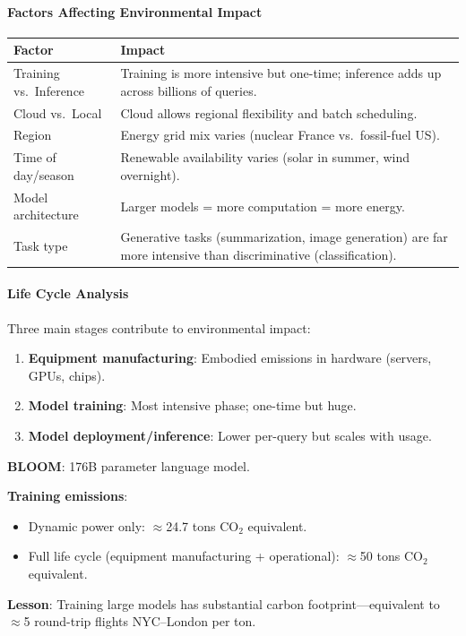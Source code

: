 \paragraph*{Factors Affecting Environmental Impact}

\begin{center}
\renewcommand{\arraystretch}{1.3}
\begin{tabular}{@{} l p{8cm} @{}}
\toprule
\textbf{Factor} & \textbf{Impact} \\
\midrule
Training vs.\ Inference & Training is more intensive but one-time; inference adds up across billions of queries. \\
Cloud vs.\ Local & Cloud allows regional flexibility and batch scheduling. \\
Region & Energy grid mix varies (nuclear France vs.\ fossil-fuel US). \\
Time of day/season & Renewable availability varies (solar in summer, wind overnight). \\
Model architecture & Larger models = more computation = more energy. \\
Task type & Generative tasks (summarization, image generation) are far more intensive than discriminative (classification). \\
\bottomrule
\end{tabular}
\end{center}

\paragraph*{Life Cycle Analysis}

Three main stages contribute to environmental impact:

\begin{enumerate}
  \item \textbf{Equipment manufacturing}: Embodied emissions in hardware (servers, GPUs, chips).
  \item \textbf{Model training}: Most intensive phase; one-time but huge.
  \item \textbf{Model deployment/inference}: Lower per-query but scales with usage.
\end{enumerate}

\begin{exbox}
\textbf{BLOOM}: 176B parameter language model.

\textbf{Training emissions}:
\begin{itemize}
  \item Dynamic power only: $\approx$24.7 tons CO$_2$ equivalent.
  \item Full life cycle (equipment manufacturing + operational): $\approx$50 tons CO$_2$ equivalent.
\end{itemize}

\textbf{Lesson}: Training large models has substantial carbon footprint---equivalent to $\approx$5 round-trip flights NYC--London per ton.
\end{exbox}

